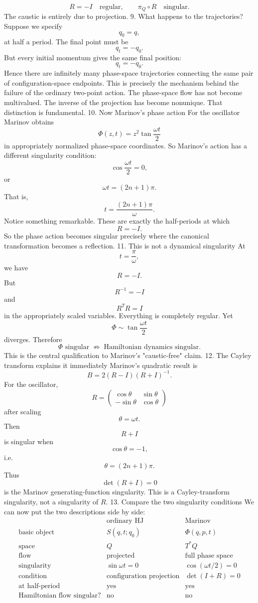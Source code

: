 $$ \boxed{ R=-I\quad\text{regular}, \qquad \pi_Q\circ R\quad\text{singular}. } $$
The caustic is entirely due to projection.
9. What happens to the trajectories?
Suppose we specify
$$ q_0=q, $$
at half a period.
The final point must be
$$ q_t=-q_0. $$
But every initial momentum gives the same final position:
$$ q_t=-q_0. $$
Hence there are infinitely many phase-space trajectories connecting the same pair of configuration-space endpoints.
This is precisely the mechanism behind the failure of the ordinary two-point action.
The phase-space flow has not become multivalued.
The inverse of the projection has become nonunique.
That distinction is fundamental.
10. Now Marinov's phase action
For the oscillator Marinov obtains
$$ \boxed{ \Phi(z,t) = z^2\tan\frac{\omega t}{2} } $$
in appropriately normalized phase-space coordinates.
So Marinov's action has a different singularity condition:
$$ \cos\frac{\omega t}{2}=0, $$
or
$$ \boxed{ \omega t=(2n+1)\pi. } $$
That is,
$$ t=\frac{(2n+1)\pi}{\omega}. $$
Notice something remarkable.
These are exactly the half-periods at which
$$ R=-I. $$
So the phase action becomes singular precisely where the canonical transformation becomes a reflection.
11. This is not a dynamical singularity
At
$$ t=\frac{\pi}{\omega}, $$
we have
$$ R=-I. $$
But
$$ R^{-1}=-I $$
and
$$ R^TR=I $$
in the appropriately scaled variables.
Everything is completely regular.
Yet
$$ \Phi\sim\tan\frac{\omega t}{2} $$
diverges.
Therefore
$$ \boxed{ \Phi\text{ singular} \;\not\Rightarrow\; \text{Hamiltonian dynamics singular}. } $$
This is the central qualification to Marinov's "caustic-free" claim.
12. The Cayley transform explains it immediately
Marinov's quadratic result is
$$ B=2(R-I)(R+I)^{-1}. $$
For the oscillator,
$$ R= \begin{pmatrix} \cos\theta&\sin\theta\\ -\sin\theta&\cos\theta \end{pmatrix} $$
after scaling
$$ \theta=\omega t. $$
Then
$$ R+I $$
is singular when
$$ \cos\theta=-1, $$
i.e.
$$ \theta=(2n+1)\pi. $$
Thus
$$ \boxed{ \det(R+I)=0 } $$
is the Marinov generating-function singularity.
This is a Cayley-transform singularity, not a singularity of \(R\).
13. Compare the two singularity conditions
We can now put the two descriptions side by side:
$$ \begin{array}{c|c|c} &\text{ordinary HJ}&\text{Marinov}\\ \hline \text{basic object} &S(q,t;q_0)&\Phi(q,p,t)\\ \text{space} &Q&T^*Q\\ \text{flow} &\text{projected}&\text{full phase space}\\ \text{singularity}& \sin\omega t=0& \cos(\omega t/2)=0\\ \text{condition}& \text{configuration projection}& \det(I+R)=0\\ \text{at half-period}& \text{yes}&\text{yes}\\ \text{Hamiltonian flow singular?}& \text{no}&\text{no} \end{array} $$
